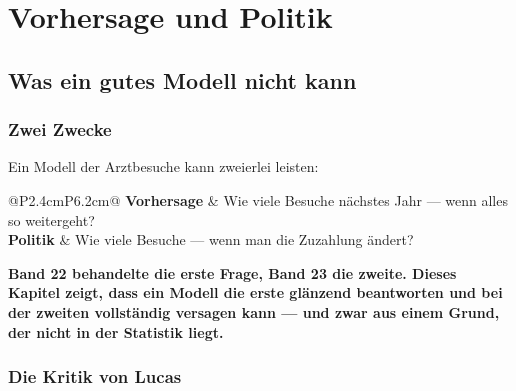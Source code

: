 \part{Vorhersage und Politik}

\chapter{Was ein gutes Modell nicht kann}

\section{Zwei Zwecke}

\begin{merksatz}
Ein Modell der Arztbesuche kann zweierlei leisten:

\begin{center}
{\small
\renewcommand{\arraystretch}{1.55}
\begin{tabular}{@{}P{2.4cm}P{6.2cm}@{}}
\toprule
\textbf{Vorhersage} & Wie viele Besuche nächstes Jahr --- wenn alles so weitergeht?\\
\textbf{Politik} & Wie viele Besuche --- wenn man die Zuzahlung ändert?\\
\bottomrule
\end{tabular}}
\end{center}

\begin{center}
\begin{minipage}{0.9\textwidth}
\textbf{Band 22 behandelte die erste Frage, Band 23 die zweite. Dieses Kapitel zeigt, dass ein Modell die erste glänzend beantworten und bei der zweiten vollständig versagen kann --- und zwar aus einem Grund, der nicht in der Statistik liegt.}
\end{minipage}
\end{center}
\end{merksatz}

\section{Die Kritik von Lucas}

